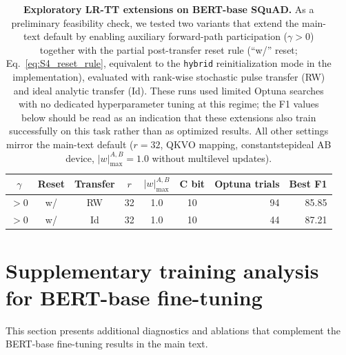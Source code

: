 \documentclass[AMA,LATO1COL]{WileyNJDv5}
\newcommand{\SIEndSection}{\FloatBarrier\clearpage}
\begin{document}
\begin{table}[!htbp]
\centering
\caption{\textbf{Exploratory LR-TT extensions on BERT-base SQuAD.}
As a preliminary feasibility check, we tested two variants that extend the
main-text default by enabling auxiliary forward-path participation
($\gamma>0$) together with the partial post-transfer reset rule
(``w/'' reset; Eq.~\eqref{eq:S4_reset_rule}, equivalent to the
\texttt{hybrid} reinitialization mode in the implementation), evaluated with
rank-wise stochastic pulse transfer (RW) and ideal analytic transfer (Id).
These runs used limited Optuna searches with no dedicated hyperparameter
tuning at this regime; the F1 values below should be read as an indication
that these extensions also train successfully on this task rather than as
optimized results. All other settings mirror the main-text default ($r=32$,
QKVO mapping, constantstepideal AB device, $|w|_{\max}^{A,B}=1.0$ without
multilevel updates).}
\label{tab:S5_lrtt_variants}
\small
\renewcommand{\arraystretch}{1.10}
\setlength{\tabcolsep}{4.0pt}
\begin{tabularx}{\linewidth}{c c c c c c r r}
\toprule
\rowcolor{HeadGray}
\textbf{$\gamma$} & \textbf{Reset} & \textbf{Transfer} & \textbf{$r$} &
\textbf{$|w|_{\max}^{A,B}$} & \textbf{C bit} &
\textbf{Optuna trials} & \textbf{Best F1} \\
\midrule
$>0$ & w/ & RW & 32 & 1.0 & 10 & 94 & 85.85 \\
$>0$ & w/ & Id & 32 & 1.0 & 10 & 44 & 87.21 \\
\bottomrule
\end{tabularx}
\end{table}

\SIEndSection

\section{Supplementary training analysis for BERT-base fine-tuning}
\label{sec:S6}

\noindent
This section presents additional diagnostics and ablations that complement the BERT-base fine-tuning results in the main text.
\end{document}
